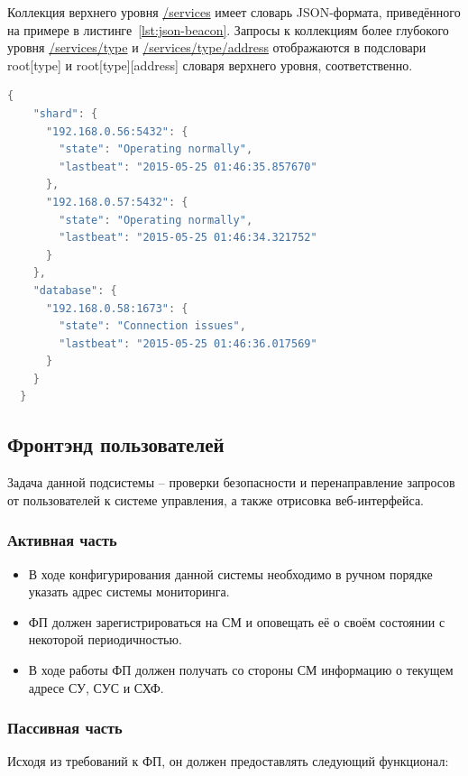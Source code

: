 \documentclass[a4paper,12pt]{report}
\numberwithin{equation}{section}
\begin{document}
  Коллекция верхнего уровня \url{/services} имеет словарь JSON-формата, приведённого на примере в листинге~\ref{lst:json-beacon}. Запросы к коллекциям более глубокого уровня \url{/services/type} и \url{/services/type/address} отображаются в подсловари root[type] и root[type][address] словаря верхнего уровня, соответственно.
  
  \floatbarrier
  
  \begin{lstlisting}[float={},language=Java,caption={Пример JSON-представления коллекции верхнего уровня сервиса мониторинга},label=lst:json-beacon]
  {
    "shard": {
      "192.168.0.56:5432": {
        "state": "Operating normally", 
        "lastbeat": "2015-05-25 01:46:35.857670"
      },
      "192.168.0.57:5432": {
        "state": "Operating normally",
        "lastbeat": "2015-05-25 01:46:34.321752"
      }
    },
    "database": {
      "192.168.0.58:1673": {
        "state": "Connection issues",
        "lastbeat": "2015-05-25 01:46:36.017569"
      }
    }
  }
  \end{lstlisting}
  
  \subsection{Фронтэнд пользователей}
  Задача данной подсистемы -- проверки безопасности и перенаправление запросов от пользователей к системе управления, а также отрисовка веб-интерфейса.
  
  \subsubsection{Активная часть}
  \begin{itemize}
    \item В ходе конфигурирования данной системы необходимо в ручном порядке указать адрес системы мониторинга.
    \item ФП должен зарегистрироваться на СМ и оповещать её о своём состоянии с некоторой периодичностью.
    \item В ходе работы ФП должен получать со стороны СМ информацию о текущем адресе СУ, СУС и СХФ.
  \end{itemize}
  
  \subsubsection{Пассивная часть}
  Исходя из требований к ФП, он должен предоставлять следующий функционал:
  
\end{document}
